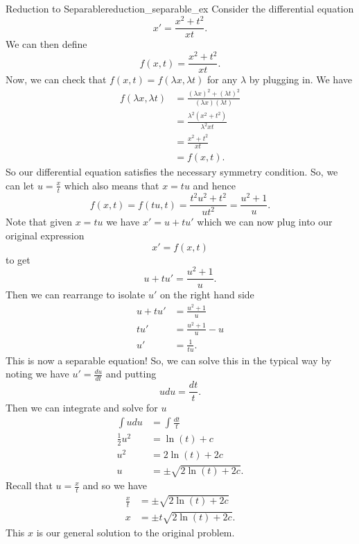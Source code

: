         \begin{ex}{Reduction to Separable}{reduction_separable_ex}
            Consider the differential equation
            \[
            x'=\frac{x^2+t^2}{xt}.
            \]
            We can then define
            \[
            f(x,t)=\frac{x^2+t^2}{xt}.
            \]
            Now, we can check that $f(x,t)=f(\lambda x, \lambda t)$ for any $\lambda$ by plugging in.  We have
            \begin{align*}
            f(\lambda x, \lambda t) &= \frac{(\lambda x)^2+(\lambda t)^2}{(\lambda x)(\lambda t)}\\
            &= \frac{\lambda^2(x^2+t^2)}{\lambda^2 xt}\\
            &= \frac{x^2+t^2}{xt}\\
            &=f(x,t).
            \end{align*}
            So our differential equation satisfies the necessary symmetry condition.  So, we can let $u=\frac{x}{t}$ which also means that $x=tu$ and hence
            \[
            f(x,t)=f(tu,t)=\frac{t^2u^2+t^2}{ut^2}=\frac{u^2+1}{u}.
            \]
            Note that given $x=tu$ we have $x'=u+tu'$ which we can now plug into our original expression
            \[
            x'=f(x,t)
            \]
            to get
            \[
            u+tu'=\frac{u^2+1}{u}.
            \]
            Then we can rearrange to isolate $u'$ on the right hand side
            \begin{align*}
                u+tu'&=\frac{u^2+1}{u}\\
                tu'&= \frac{u^2+1}{u}-u\\
                u'&= \frac{1}{tu}.
            \end{align*}
            This is now a separable equation! So, we can solve this in the typical way by noting we have $u'=\frac{du}{dt}$ and putting
            \[
            udu=\frac{dt}{t}.
            \]
            Then we can integrate and solve for $u$
            \begin{align*}
                \int udu &= \int \frac{dt}{t}\\
                \frac{1}{2}u^2 &= \ln(t)+c\\
                u^2&= 2\ln(t)+2c\\
                u&=\pm \sqrt{2\ln(t)+2c}.
            \end{align*}
            Recall that $u=\frac{x}{t}$ and so we have
            \begin{align*}
                \frac{x}{t}&= \pm \sqrt{2\ln(t)+2c}\\
                x&= \pm t\sqrt{2\ln(t)+2c}.
            \end{align*}
            This $x$ is our general solution to the original problem.
        \end{ex}



